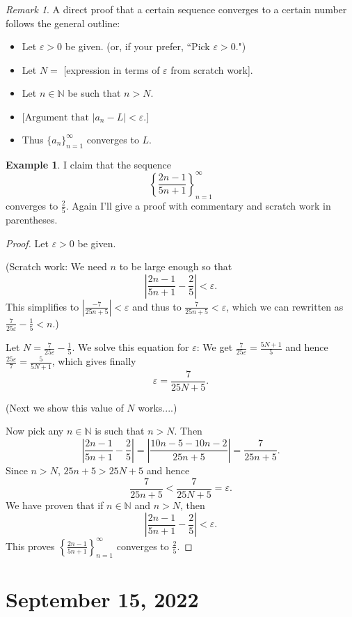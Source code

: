 \documentclass[12pt]{amsart}
\def\e{\varepsilon}
\newcommand{\N}{\mathbb{N}}
\numberwithin{equation}{section}
\theoremstyle{plain} %
\newcommand{\Sept}[1]{\section{September #1, 2022}}
\theoremstyle{definition}
\newtheorem{ex}[equation]{Example}
\theoremstyle{remark}
\newtheorem{rem}[equation]{Remark}
\begin{document}
\begin{rem} A direct proof that a certain sequence converges to a certain number follows the general outline:
\begin{itemize}
	\item Let $\e > 0$ be given. (or, if your prefer, ``Pick $\e > 0$.")
	\item Let $N =$ [expression in terms of $\e$ from scratch work].
	\item Let $n \in \N$ be such that $n > N$.
\item $\text{[Argument that $|a_n-L|<\e$.]}$
	\item Thus $\{a_n\}_{n=1}^{\infty}$ converges to $L$.
\end{itemize}
\end{rem}



\begin{ex} I claim that the sequence
$$
\left\{ \frac{2n - 1}{5n + 1} \right\}_{n=1}^\infty
$$
converges to $\frac{2}{5}$.  Again I'll give a proof with commentary and scratch work in parentheses.

\begin{proof} 
Let $\e > 0$ be given. 

(Scratch work: We need $n$ to be large enough so that
$$
\left|\frac{2n - 1}{5n + 1} - \frac{2}{5}\right| < \e.
$$
This simplifies to 
$\left|\frac{-7}{25n + 5}\right| < \e$
and thus to
$\frac{7}{25n + 5} < \e$, which we can rewritten as $\frac{7}{25\e} - \frac15 < n$.)

Let $N = \frac{7}{25\e} - \frac15$. We solve this equation for $\e$: We get
$\frac{7}{25 \e} = \frac{5N +  1}{5}$ and hence 
$\frac{25 \e}{7} = \frac{5}{5N +  1}$, which gives finally
$$
\e = \frac{7}{25N + 5}.
$$

(Next we show this value of $N$ works....)

Now pick any $n \in \N$ is such that
$n > N$. Then
$$
\left|\frac{2n - 1}{5n + 1} - \frac{2}{5}\right| 
= \left|\frac{10n - 5   - 10n -2               }{25n + 5} \right| 
=  \frac{7}{25n + 5}.
$$
Since $n > N$, $25n + 5> 25N + 5$ and hence
$$
\frac{7}{25n + 5} < \frac{7}{25N + 5} = \e.
$$
We have proven that if $n \in \N$ and $n > N$, then
$$
\left|\frac{2n - 1}{5n + 1} - \frac{2}{5}\right| < \e.
$$
This proves $\left\{ \frac{2n - 1}{5n + 1} \right\}_{n=1}^\infty$
converges to $\frac25$.
\end{proof}
\end{ex}

\Sept{15}
\end{document}
